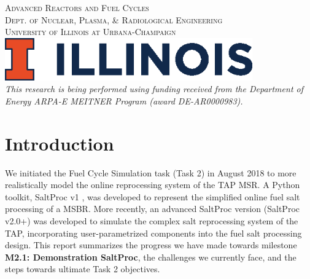 \documentclass[12pt]{article} %
\begin{document}
\begin{titlepage}
    \textsc{\LARGE Advanced Reactors and Fuel Cycles}\\[0.25cm] %
    
    \textsc{\large Dept. of Nuclear, Plasma, \& Radiological Engineering}\\%
    
    \textsc{\large University of Illinois at Urbana-Champaign}\\ %


    \vspace{0.5cm}
    \includegraphics[width=0.8\textwidth]{illinois}\\[1cm] %

    \textit{This research is being performed using funding received from the 
    Department of Energy ARPA-E MEITNER Program (award DE-AR0000983).}

\end{titlepage}

\section{Introduction}
We initiated the Fuel Cycle Simulation task (Task 2) in August 2018 to more 
realistically model the online reprocessing system of the \gls{TAP} 
\gls{MSR}. A Python toolkit, SaltProc v1 \cite{rykhlevskii_modeling_2019,
rykhlevskii_advanced_2018, rykhlevskii_arfc/saltproc_2018}, was developed to 
represent the simplified online fuel salt processing of a \gls{MSBR}.
More recently, an advanced SaltProc version (SaltProc v2.0+) was developed 
to simulate the complex salt reprocessing system of the \gls{TAP}, 
incorporating user-parametrized components into the fuel salt processing 
design. This report summarizes the progress we have made towards milestone 
\textbf{M2.1: Demonstration SaltProc}, the challenges we currently face, and 
the steps towards ultimate Task 2 objectives.
\end{document}
